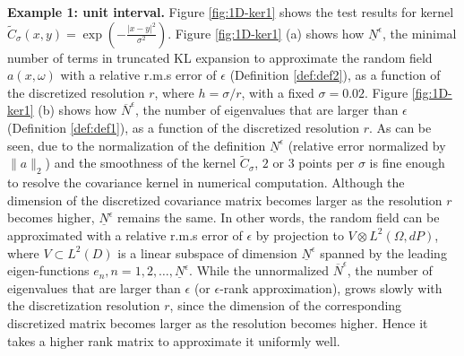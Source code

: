 \documentclass[11pt]{amsart}
\newcommand{\w}{\omega}
\newcommand{\W}{\Omega}
\begin{document}
{\bf Example 1: unit interval.}
Figure \ref{fig:1D-ker1} shows the test results for kernel $\tilde{C}_{\sigma}(x,y)=\exp(-\frac{|x-y|^2}{\sigma^2})$.  Figure \ref{fig:1D-ker1} (a) shows how $\underline{N}^{\epsilon}$, the minimal number of terms in truncated KL expansion to approximate the random field $a(x,\w)$ with a relative r.m.s error of $\epsilon$ (Definition \ref{def:def2}), as a function of the discretized resolution $r$, where $h=\sigma/r$, with a fixed $\sigma=0.02$. Figure \ref{fig:1D-ker1} (b) shows how $\overline{N}^{\epsilon}$, the number of eigenvalues that are larger than $\epsilon$ (Definition \ref{def:def1}), as a function of the discretized resolution $r$. As can be seen, due to the normalization of the definition $\underline{N}^{\epsilon}$ (relative error normalized by $\|a\|_2$) and the smoothness of the kernel $\tilde{C}_{\sigma}$, $2$ or $3$ points per $\sigma$ is fine enough to resolve the covariance kernel in numerical computation. Although the dimension of the discretized covariance matrix becomes larger  as the resolution $r$ becomes higher, $\underline{N}^{\epsilon}$ remains the same. In other words, the random field can be approximated with a relative r.m.s error of $\epsilon$ by projection to $V\otimes L^2(\W,dP)$, where $V\subset L^2(D)$ is a linear subspace of dimension $\underline{N}^{\epsilon}$ spanned by the leading eigen-functions $e_n, n=1, 2, \ldots, \underline{N}^{\epsilon}$.
While the unnormalized $\overline{N}^{\epsilon}$, the number of eigenvalues that are larger than $\epsilon$ (or $\epsilon$-rank approximation), grows slowly with the discretization resolution $r$, since the dimension of the corresponding discretized matrix becomes larger as the resolution becomes higher. Hence it takes a higher rank matrix to approximate it uniformly well. 
\end{document}
